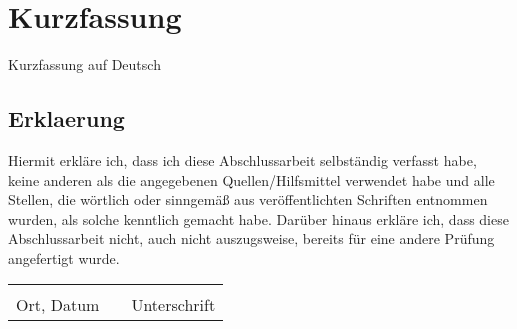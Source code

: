 \chapter*{Kurzfassung}
Kurzfassung auf Deutsch



\linespread{1.25}\selectfont

\tableofcontents %
\listoffigures  %
\listoftables
\blankpage
\blankpage





%
%

\blankpage

\begin{appendices}
	\blankpage
	
\end{appendices}

\pagestyle{empty}
\newpage
\section*{Erklaerung}

Hiermit erkläre ich, dass ich diese Abschlussarbeit selbständig verfasst
habe, keine anderen als die angegebenen Quellen/Hilfsmittel verwendet
habe und alle Stellen, die wörtlich oder sinngemäß aus veröffentlichten
Schriften entnommen wurden, als solche kenntlich gemacht habe. Darüber
hinaus erkläre ich, dass diese Abschlussarbeit nicht, auch nicht auszugsweise,
bereits für eine andere Prüfung angefertigt wurde.\\
\begin{tabular}{lp{3em}l}
\vspace{1cm}
 \hspace{6cm}   && \hspace{6cm} \\\cline{1-1}\cline{3-3}
 Ort, Datum     && Unterschrift
\end{tabular}


